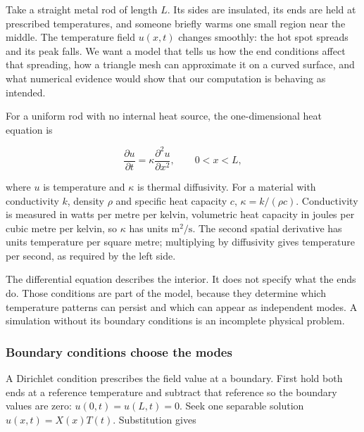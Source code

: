 \hypertarget{02-foundations-ii-ch025-heat-on-a-rod-why-boundaries-modes-and-mesh-operators-belong-together}{}

Take a straight metal rod of length \(L\). Its sides are insulated, its ends are held at prescribed temperatures, and someone briefly warms one small region near the middle. The temperature field \(u(x,t)\) changes smoothly: the hot spot spreads and its peak falls. We want a model that tells us how the end conditions affect that spreading, how a triangle mesh can approximate it on a curved surface, and what numerical evidence would show that our computation is behaving as intended.

For a uniform rod with no internal heat source, the one-dimensional heat equation is

\[
\frac{\partial u}{\partial t}=\kappa\frac{\partial^2u}{\partial x^2},\qquad 0<x<L,
\]

where \(u\) is temperature and \(\kappa\) is thermal diffusivity. For a material with conductivity \(k\), density \(\rho\) and specific heat capacity \(c\), \(\kappa=k/(\rho c)\). Conductivity is measured in watts per metre per kelvin, volumetric heat capacity in joules per cubic metre per kelvin, so \(\kappa\) has units \(\mathrm{m^2/s}\). The second spatial derivative has units temperature per square metre; multiplying by diffusivity gives temperature per second, as required by the left side.

The differential equation describes the interior. It does not specify what the ends do. Those conditions are part of the model, because they determine which temperature patterns can persist and which can appear as independent modes. A simulation without its boundary conditions is an incomplete physical problem.


\subsubsection{Boundary conditions choose the modes}\label{02-foundations-ii-ch025-boundary-conditions-choose-the-modes}

\hypertarget{02-foundations-ii-ch025-boundary-conditions-choose-the-modes}{}

A Dirichlet condition prescribes the field value at a boundary. First hold both ends at a reference temperature and subtract that reference so the boundary values are zero: \(u(0,t)=u(L,t)=0\). Seek one separable solution \(u(x,t)=X(x)T(t)\). Substitution gives

